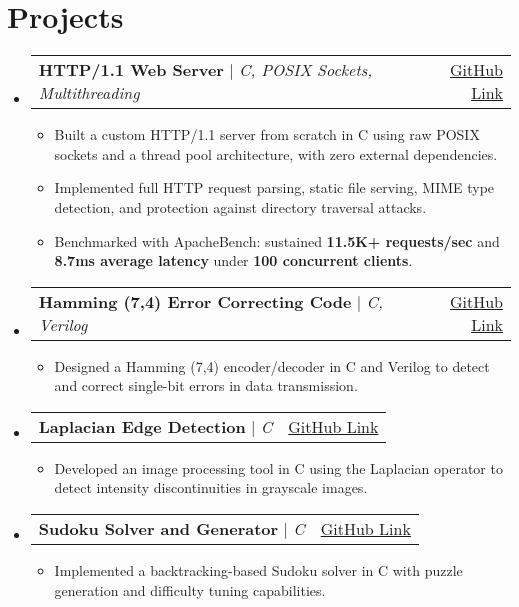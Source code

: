\documentclass[letterpaper,11pt]{article}
\makeatletter
\newcommand{\resumeItem}[1]{
  \item\small{
    {#1 \vspace{-2pt}}
  }
}
\newcommand{\resumeProjectHeading}[2]{
    \item
    \begin{tabular*}{0.97\textwidth}{l@{\extracolsep{\fill}}r}
      \small#1 & #2 \\
    \end{tabular*}\vspace{-7pt}
}
\newcommand{\resumeSubHeadingListStart}{\begin{itemize}[leftmargin=0.15in, label={}]}
\newcommand{\resumeSubHeadingListEnd}{\end{itemize}}
\newcommand{\resumeItemListStart}{\begin{itemize}}
\newcommand{\resumeItemListEnd}{\end{itemize}\vspace{-5pt}}
\makeatother
\begin{document}
\section{Projects}
  \resumeSubHeadingListStart
    \resumeProjectHeading
  {\textbf{HTTP/1.1 Web Server} $|$ \emph{C, POSIX Sockets, Multithreading}}{\href{https://github.com/Aditya-1020/Criver}{GitHub Link}}
  \resumeItemListStart
    \resumeItem{Built a custom HTTP/1.1 server from scratch in C using raw POSIX sockets and a thread pool architecture, with zero external dependencies.}
    \resumeItem{Implemented full HTTP request parsing, static file serving, MIME type detection, and protection against directory traversal attacks.}
    \resumeItem{Benchmarked with ApacheBench: sustained \textbf{11.5K+ requests/sec} and \textbf{8.7ms average latency} under \textbf{100 concurrent clients}.}
  \resumeItemListEnd
    \resumeProjectHeading
        {\textbf{Hamming (7,4) Error Correcting Code} $|$ \emph{C, Verilog}}{\href{https://github.com/Aditya-1020/Hamming_7-4}{GitHub Link}}
        \resumeItemListStart
          \resumeItem{Designed a Hamming (7,4) encoder/decoder in C and Verilog to detect and correct single-bit errors in data transmission.}
        \resumeItemListEnd
    \resumeProjectHeading
        {\textbf{Laplacian Edge Detection} $|$ \emph{C}}{\href{https://github.com/Aditya-1020/Laplacian-edge}{GitHub Link}}
        \resumeItemListStart
          \resumeItem{Developed an image processing tool in C using the Laplacian operator to detect intensity discontinuities in grayscale images.}
        \resumeItemListEnd
    \resumeProjectHeading
        {\textbf{Sudoku Solver and Generator} $|$ \emph{C}}{\href{https://github.com/Aditya-1020/sudoku_solver}{GitHub Link}}
        \resumeItemListStart
          \resumeItem{Implemented a backtracking-based Sudoku solver in C with puzzle generation and difficulty tuning capabilities.}
        \resumeItemListEnd
  \resumeSubHeadingListEnd
\end{document}
